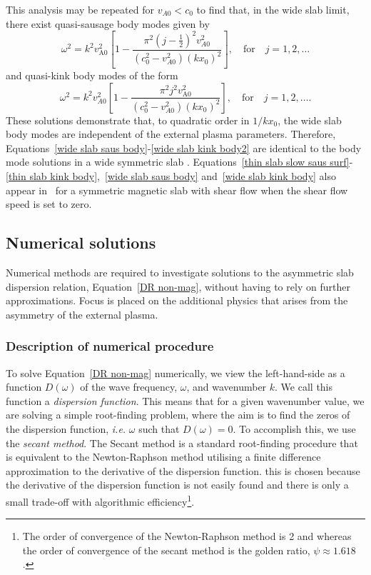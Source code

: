 \documentclass[12pt,draft]{../style-files/ociamthesis}
\begin{document}
This analysis may be repeated for $v_{A0} < c_0$ to find that, in the wide slab limit, there exist quasi-sausage body modes given by
\begin{equation}
\omega^2 = k^2v_\textrm{A0}^2\left[1 - \frac{\pi^2(j - \frac{1}{2})^2v_{A0}^2}{(c_0^2 - v_{A0}^2)(kx_0)^2}\right], \quad \text{for} \quad j = 1, 2, \ldots \label{wide slab saus body2}
\end{equation}
and quasi-kink body modes of the form
\begin{equation}
\omega^2 = k^2v_{A0}^2\left[1 - \frac{\pi^2j^2v_\textrm{A0}^2}{(c_0^2 - v_{A0}^2)(kx_0)^2}\right], \quad \text{for} \quad j = 1, 2, \ldots . \label{wide slab kink body2}
\end{equation}
These solutions demonstrate that, to quadratic order in $1/kx_0$, the wide slab body modes are independent of the external plasma parameters. Therefore, Equations~\eqref{wide slab saus body}-\eqref{wide slab kink body2} are identical to the body mode solutions in a wide symmetric slab \citep{rob81b}. Equations~\eqref{thin slab slow saus surf}-\eqref{thin slab kink body},~\eqref{wide slab saus body} and~\eqref{wide slab kink body} also appear in~\cite{li_etal13} for a symmetric magnetic slab with shear flow when the shear flow speed is set to zero.


\subsection{Numerical solutions} \label{sec: numerical solutions}

Numerical methods are required to investigate solutions to the asymmetric slab dispersion relation, Equation~\eqref{DR non-mag}, without having to rely on further approximations. Focus is placed on the additional physics that arises from the asymmetry of the external plasma.


\subsubsection{Description of numerical procedure}
To solve Equation~\eqref{DR non-mag} numerically, we view the left-hand-side as a function $D(\omega)$ of the wave frequency, $\omega$, and wavenumber $k$. We call this function a \textit{dispersion function}. This means that for a given wavenumber value, we are solving a simple root-finding problem, where the aim is to find the zeros of the dispersion function, \textit{i.e.} $\omega$ such that $D(\omega) = 0$. To accomplish this, we use the \textit{secant method}. The Secant method is a standard root-finding procedure that is equivalent to the Newton-Raphson method utilising a finite difference approximation to the derivative of the dispersion function. this is chosen because the derivative of the dispersion function is not easily found and there is only a small trade-off with algorithmic efficiency\footnote{The order of convergence of the Newton-Raphson method is 2 and whereas the order of convergence of the secant method is the golden ratio, $\psi \approx 1.618$.}.
\end{document}
